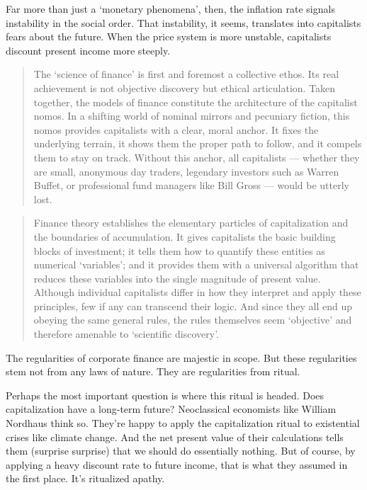 \documentclass[
]{book}
\begin{document}
Far more than just a `monetary phenomena', then, the inflation rate signals instability in the social order. That instability, it seems, translates into capitalists fears about the future. When the price system is more unstable, capitalists discount present income more steeply.

\begin{quote}
The `science of finance' is first and foremost a collective ethos. Its real achievement is not objective discovery but ethical articulation. Taken together, the models of finance constitute the architecture of the capitalist nomos. In a shifting world of nominal mirrors and pecuniary fiction, this nomos provides capitalists with a clear, moral anchor. It fixes the underlying terrain, it shows them the proper path to follow, and it compels them to stay on track. Without this anchor, all capitalists --- whether they are small, anonymous day traders, legendary investors such as Warren Buffet, or professional fund managers like Bill Gross --- would be utterly lost.
\end{quote}

\begin{quote}
Finance theory establishes the elementary particles of capitalization and the boundaries of accumulation. It gives capitalists the basic building blocks of investment; it tells them how to quantify these entities as numerical `variables'; and it provides them with a universal algorithm that reduces these variables into the single magnitude of present value. Although individual capitalists differ in how they interpret and apply these principles, few if any can transcend their logic. And since they all end up obeying the same general rules, the rules themselves seem `objective' and therefore amenable to `scientific discovery'.
\end{quote}

The regularities of corporate finance are majestic in scope. But these regularities stem not from any laws of nature. They are regularities from ritual.

Perhaps the most important question is where this ritual is headed. Does capitalization have a long-term future? Neoclassical economists like William Nordhaus think so. They're happy to apply the capitalization ritual to existential crises like climate change. And the net present value of their calculations tells them (surprise surprise) that we should do essentially nothing. But of course, by applying a heavy discount rate to future income, that is what they assumed in the first place. It's ritualized apathy.
\end{document}
